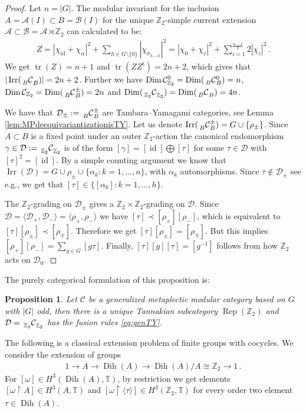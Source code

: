 \documentclass[twoside,11pt,reqno]{amsart}
\makeatletter
\newtheorem{prop}[thm]{Proposition}
\theoremstyle{definition}
\theoremstyle{remark}
\newcommand{\cB}{\mathcal{B}}
\newcommand{\cD}{\mathcal{D}}
\newcommand{\cC}{\mathcal{C}}
\newcommand{\A}{\mathcal{A}}
\newcommand{\TT}{\mathbb{T}}
\newcommand{\ZZ}{\mathbb{Z}}
\DeclareMathOperator{\Rep}{Rep}
\DeclareMathOperator{\id}{id}
\DeclareMathOperator{\tr}{tr}
\DeclareRobustCommand{\eg}{e.g.\@\xspace}
\DeclareMathOperator*{\Dim}{Dim}
\DeclareMathOperator{\Dih}{Dih}
\DeclareMathOperator{\Irr}{Irr}
\newcommand{\bim}[4][]{{}\prescript{\vphantom{#1}}{#2}{#3}^{#1}_{#4}}
\makeatother
\begin{document}
\begin{proof}
  Let $n=|G|$. 
  The modular invariant \cite{BcEvKa1999,BcEvKa2000}
  for the inclusion $A=\A(I)\subset B=\cB(I)$
  for the unique $\ZZ_2$-simple current extension 
  $\A \subset \cB=\A\rtimes \ZZ_2$
  can calculated to be:
  \begin{align}
    Z=  |\chi_{\id}+\chi_\alpha|^2 + \sum_{h\in G\setminus\{0\}} |\chi_{\sigma_{h,-h}}|^2 =
    |\chi_0+\chi_r|^2 + \sum_{i=1}^{\frac{n-1}2} 2|\chi_i|^2\,.
  \end{align}
  We get  
  $\tr(Z)=n+1$ and $\tr(ZZ^\mathrm{t})=2n+2$, which gives
  \cite[Corollary 6.10]{BcEvKa1999} that $|\Irr(\bim B\cC B)|=2n+2$.
  Further we have $\Dim \cC_{\ZZ_2}^0 =\Dim (\bim[0] B \cC B)=n$,  
  $\Dim \cC_{\ZZ_2}=\Dim (\bim[\pm] B \cC B)=2n$ and
  $\Dim(\bim{\ZZ_2}\cC{\ZZ_2})=\Dim (\bim B \cC B)=4n$.


  We have that $\cD_\pm:=\bim[\pm] B \cC B$ are Tambara--Yamagami categories, 
  see Lemma \ref{lem:MPdeequivariantizationisTY}. 
  Let us denote $\Irr(\bim[\pm]B\cC B)=G\cup \{\rho_\pm\}$. 
  Since $A\subset B$ is a fixed point under an outer $\ZZ_2$-action the 
  canonical endomorphism $\gamma\in \cD:=\bim {\ZZ_2}\cC{\ZZ_2}$ is of the form
  $[\gamma]=[\id]\bigoplus [\tau]$ for some $\tau\in \cD$ with $[\tau]^2=[\id]$.
  By a simple counting argument we know that 
  $\Irr(\cD) = G\cup {\rho_\pm}\cup \{\alpha_k:k=1,\ldots, n\}$,
  with $\alpha_k$ automorphisms.
  Since $\tau\not\in \cD_\pm$ see \eg \cite[Lemma 5.8]{Bi2016}, we get that 
  $[\tau] \in \{[\alpha_k] :k=1,\ldots, h\}$.
  
  The $\ZZ_2$-grading on $\cD_\pm$ gives a $\ZZ_2\times\ZZ_2$-grading on $\cD$. 
  Since $\cD =\langle\cD_+,\cD_-\rangle = \langle \rho_+,\rho_-\rangle$ we have 
  $[\tau]\prec [\rho_+][\rho_-]$, which is equivalent to 
  $[\tau][\rho_\pm]\prec [\rho_\mp]$. 
  Therefore we get $[\tau][\rho_\pm]= [\rho_\mp]$.
  But this implies $[\rho_+][\rho_-]=\sum_{g\in G}[g\tau ]$.
  Finally, $[\tau][g][\tau]=[g^{-1}]$ follows from how $\ZZ_2$ acts on $\cD_0$.
\end{proof}
The purely categorical formulation of this proposition is:
\begin{prop}
  \label{prop:GenTY}
  Let $\cC$ be a generalized metaplectic modular category based on $G$ with 
  $|G|$ odd,
  then there is a unique Tannakian subcategory $\Rep(\ZZ_2)$
  and $\cD=\bim{\ZZ_2}\cC{\ZZ_2}$ has the fusion rules 
  \eqref{eq:genTY}.
\end{prop}
The following is a classical extension problem of finite groups with cocycles.
We consider the extension of groups
\begin{align}
1\to A\to \Dih(A)\to \Dih(A)/A\cong \ZZ_2 \to 1\,.
\end{align}
For $[\omega] \in H^3(\Dih(A),\TT)$, by restriction we get elements 
$[\omega\restriction A]\in H^3(A,\TT)$
and $[\omega\restriction \langle \tau\rangle]\in H^3(\ZZ_2,\TT)$ for 
every order two element $\tau\in \Dih(A)$.
\end{document}

